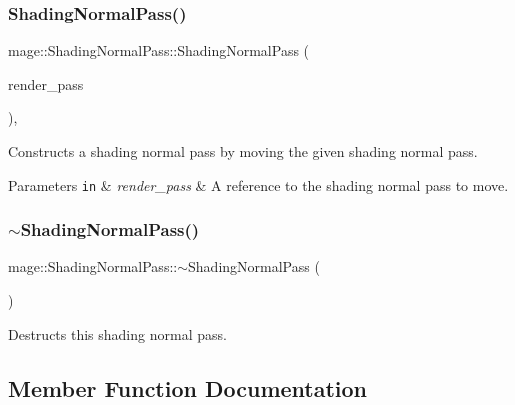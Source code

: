 \subsubsection{\texorpdfstring{Shading\+Normal\+Pass()}{ShadingNormalPass()}\hspace{0.1cm}{\footnotesize\ttfamily [3/3]}}
{\footnotesize\ttfamily mage\+::\+Shading\+Normal\+Pass\+::\+Shading\+Normal\+Pass (\begin{DoxyParamCaption}\item[{\hyperlink{classmage_1_1_shading_normal_pass}{Shading\+Normal\+Pass} \&\&}]{render\+\_\+pass }\end{DoxyParamCaption})\hspace{0.3cm}{\ttfamily [default]}, {\ttfamily [noexcept]}}

Constructs a shading normal pass by moving the given shading normal pass.


\begin{DoxyParams}[1]{Parameters}
\mbox{\tt in}  & {\em render\+\_\+pass} & A reference to the shading normal pass to move. \\
\hline
\end{DoxyParams}
\hypertarget{classmage_1_1_shading_normal_pass_aba7194077210d32dbcbc6cfbf4adba8f}{}\label{classmage_1_1_shading_normal_pass_aba7194077210d32dbcbc6cfbf4adba8f} 
\subsubsection{\texorpdfstring{$\sim$\+Shading\+Normal\+Pass()}{~ShadingNormalPass()}}
{\footnotesize\ttfamily mage\+::\+Shading\+Normal\+Pass\+::$\sim$\+Shading\+Normal\+Pass (\begin{DoxyParamCaption}{ }\end{DoxyParamCaption})\hspace{0.3cm}{\ttfamily [default]}}

Destructs this shading normal pass. 

\subsection{Member Function Documentation}
\hypertarget{classmage_1_1_shading_normal_pass_a49c57b6c8a6aee0678556f25f9c97d11}{}\label{classmage_1_1_shading_normal_pass_a49c57b6c8a6aee0678556f25f9c97d11} 
